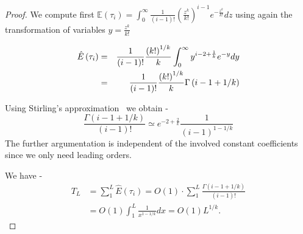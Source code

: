 \begin{proof}
We compute first $\mathbb{E}\left( \tau _{i}\right)
=\int_{0}^{\infty }\frac{1}{\left( i-1\right) !}\left( \frac{z^{k}}{k!}%
\right) ^{i-1}e^{-\frac{z^{k}}{k!}}dz$ using again the transformation of
variables $y=\frac{z^{k}}{k!}$

\begin{eqnarray}
\hat E \left( \tau _{i}\right) &=&\frac{1}{\left( i-1\right) !}\frac{\left( k!\right) ^{1/k}}{%
k}\int_{0}^{\infty }y^{i-2+\frac{1}{k}}e^{-y}dy \\
&=&\frac{1}{\left( i-1\right) !}\frac{\left( k!\right) ^{1/k}}{k}\Gamma
\left( i-1+1/k\right)
\end{eqnarray}



Using Stirling's approximation~\cite{feller2008introduction} we obtain - \\
\begin{equation}
\frac{\Gamma \left( i-1+1/k\right) }{\left( i-1\right) !}\simeq e^{-2+\frac{2%
}{k}}\frac{1}{\left( i-1\right) ^{1-1/k}}
\end{equation}
The further argumentation is independent of the involved constant
coefficients since we only need leading orders.

We have -  
\begin{equation}
\begin{aligned} T_{L}&=\sum_{1}^{L}\hat E \left( \tau _{i}\right)
=O\left( 1\right) \cdot \sum_{1}^{L}\frac{\Gamma \left( i-1+1/k\right)
}{\left( i-1\right) !}\\&=O\left( 1\right)
\int_{1}^{L}\frac{1}{x^{1-1/k}}dx= O\left( 1\right) L^{1/k}. \end{aligned}
\end{equation}


\end{proof}
